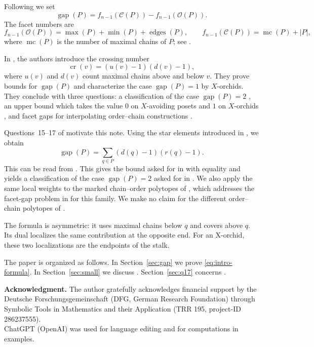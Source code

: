 \documentclass[a4paper, 11pt]{amsart}
\theoremstyle{definition}
\theoremstyle{remark}
\newcommand{\cO}{\mathcal O}
\newcommand{\cC}{\mathcal C}
\newcommand{\gap}{\operatorname{gap}}
\newcommand{\ed}{\operatorname{edges}}
\newcommand{\mi}{\operatorname{min}}
\newcommand{\ma}{\operatorname{max}}
\newcommand{\mc}{\operatorname{mc}}
\begin{document}
Following \cite{BhandariEtAl2025} we set
\[
  \gap(P)=f_{n-1}(\cC(P))-f_{n-1}(\cO(P)).
\]
The facet numbers are
\begin{equation}\label{eq:basic-facets}
 f_{n-1}(\cO(P))=\ma(P)+\mi(P)+\ed(P),
 \qquad
 f_{n-1}(\cC(P))=\mc(P)+|P|,
\end{equation}
where $\mc(P)$ is the number of maximal chains of $P$; see \cite{HibiLi2016,BhandariEtAl2025}.

In \cite{BhandariEtAl2025}, the authors introduce the crossing number
\[
  \operatorname{cr}(v)=(u(v)-1)(d(v)-1),
\]
where $u(v)$ and $d(v)$ count maximal chains above and below $v$. They prove bounds for $\gap(P)$ and characterize the case $\gap(P)=1$ by $X$-orchids. They conclude with three questions: a classification of the case $\gap(P)=2$ \cite[Question~15]{BhandariEtAl2025}, an upper bound which takes the value $0$ on $X$-avoiding posets and $1$ on $X$-orchids \cite[Question~16]{BhandariEtAl2025}, and facet gaps for interpolating order--chain constructions \cite[Question~17]{BhandariEtAl2025}.

Questions~15--17 of \cite{BhandariEtAl2025} motivate this note. Using the star elements introduced in \cite{FangFourier2016, HibiLi2016}, we obtain
\begin{equation}\label{eq:intro-formula}
  \gap(P)=\sum_{q\in P}(d(q)-1)(r(q)-1).
\end{equation}
This can be read from \cite[Proposition~4.5 and Corollary~4.6]{FangFourier2016}. This gives the bound asked for in
\cite[Question~16]{BhandariEtAl2025} with equality and yields a
classification of the case $\gap(P)=2$ asked for in
\cite[Question~15]{BhandariEtAl2025}. We also apply the same local weights
to the marked chain--order polytopes of \cite{FangFourier2016}, which
addresses the facet-gap problem in
\cite[Question~17]{BhandariEtAl2025} for this family. We make no claim for
the different order--chain polytopes of \cite{HibiEtAl2019}.

The formula is asymmetric: it uses maximal chains below $q$ and covers above $q$. Its dual localizes the same contribution at the opposite end. For an X-orchid, these two localizations are the endpoints of the stalk.

The paper is organized as follows. In Section~\ref{sec:gap} we prove \eqref{eq:intro-formula}. In Section~\ref{sec:small} we discuss \cite[Questions~15 and~16]{BhandariEtAl2025}. Section~\ref{sec:q17} concerns \cite[Question~17]{BhandariEtAl2025}.

\medskip
\noindent\textbf{Acknowledgment.}
The author gratefully acknowledges financial support by the Deutsche Forschungsgemeinschaft (DFG, German Research Foundation) through Symbolic Tools in Mathematics and their Application (TRR 195, project-ID 286237555).\\
ChatGPT (OpenAI) was used for language editing and for computations in examples.
\end{document}
